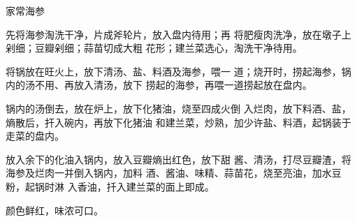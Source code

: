 \begin{recipe}{家常海参}

\ingredients



\cooking

\step 先将海参淘洗干净，片成斧轮片，放入盘内待用；再 将肥瘦肉洗净，放在墩子上剁细；豆瓣剁细；蒜苗切成大粗 花形；建兰菜选心，淘洗干净待用。

\step 将锅放在旺火上，放下清汤、盐、料酒及海参，喂一 道；烧开时，捞起海参，锅内的汤不用、再放入清汤，放下 捞起的海参，再喂一道捞起放在盘内。

\step 锅内的汤倒去，放在炉上，放下化猪油，烧至四成火倒 入烂肉，放下料酒、盐，熵散后，扞入碗内，再放下化猪油 和建兰菜，炒熟，加少许盐、料酒，起锅装于走菜的盘内。

放入余下的化油入锅内，放入豆瓣熵出红色，放下甜 酱、清汤，打尽豆瓣渣，将海参及烂肉一并倒入锅内，加料 酒、酱油、味精、蒜苗花，烧至亮油，加水豆粉，起锅时淋 入香油，扦入建兰菜的面上即成。

\notes

颜色鲜红，味浓可口。

\end{recipe}

